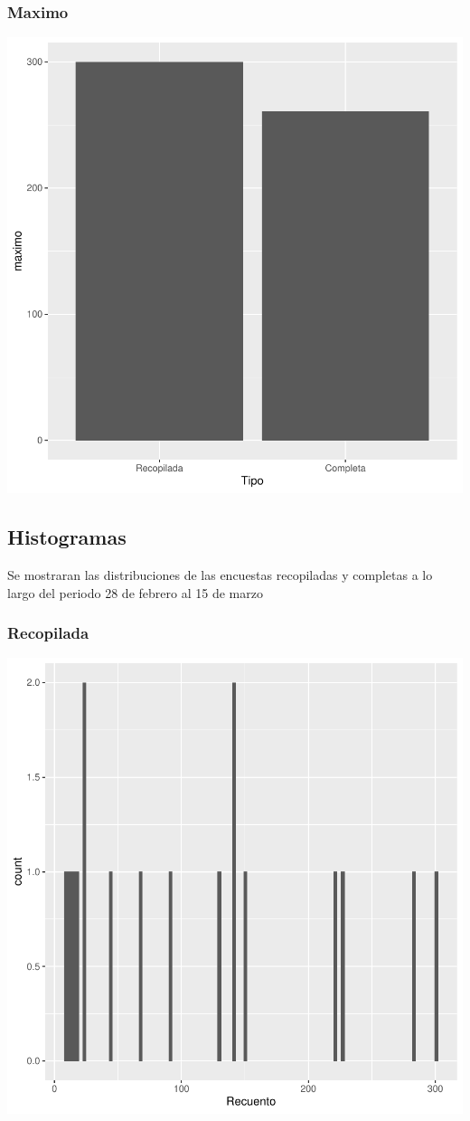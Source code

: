 \documentclass{article}
\begin{document}
\subsubsection{Maximo}

\includegraphics{seguimento2-021}

\subsection{Histogramas}
Se mostraran las distribuciones de las encuestas recopiladas y completas a lo largo del periodo 28 de febrero al 15 de marzo

\subsubsection{Recopilada}

\includegraphics{seguimento2-022}
\end{document}

